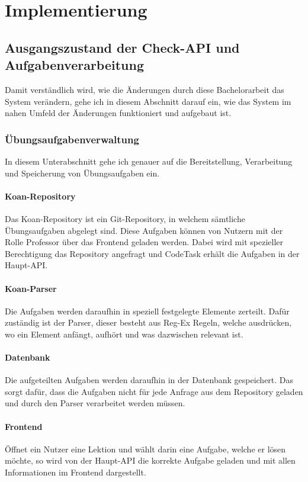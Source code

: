 \chapter{Implementierung}
\label{chap:implementierung}

\section{Ausgangszustand der Check-API und Aufgabenverarbeitung}
Damit verständlich wird, wie die Änderungen durch diese Bachelorarbeit das System verändern, gehe ich in diesem Abschnitt darauf ein, wie das System im nahen Umfeld der Änderungen funktioniert und aufgebaut ist.

\subsection{Übungsaufgabenverwaltung}
In diesem Unterabschnitt gehe ich genauer auf die Bereitstellung, Verarbeitung und Speicherung von Übungsaufgaben ein.

\subsubsection{Koan-Repository}
Das Koan-Repository ist ein Git-Repository, in welchem sämtliche Übungsaufgaben abgelegt sind. Diese Aufgaben können von Nutzern mit der Rolle Professor über das Frontend geladen werden. Dabei wird mit spezieller Berechtigung das Repository angefragt und CodeTask erhält die Aufgaben in der Haupt-API.

\subsubsection{Koan-Parser}
Die Aufgaben werden daraufhin in speziell festgelegte Elemente zerteilt. Dafür zuständig ist der Parser, dieser besteht aus Reg-Ex Regeln, welche ausdrücken, wo ein Element anfängt, aufhört und was dazwischen relevant ist.

\subsubsection{Datenbank}
Die aufgeteilten Aufgaben werden daraufhin in der Datenbank gespeichert. Das sorgt dafür, dass die Aufgaben nicht für jede Anfrage aus dem Repository geladen und durch den Parser verarbeitet werden müssen.

\subsubsection{Frontend}
Öffnet ein Nutzer eine Lektion und wählt darin eine Aufgabe, welche er lösen möchte, so wird von der Haupt-API die korrekte Aufgabe geladen und mit allen Informationen im Frontend dargestellt.

